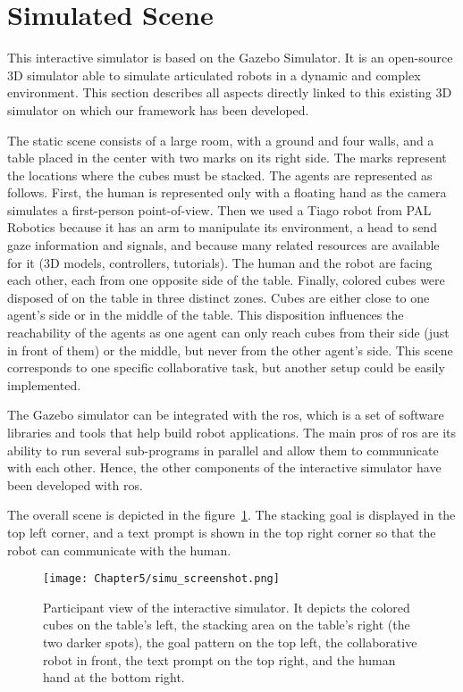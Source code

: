 \section{Simulated Scene}

This interactive simulator is based on the Gazebo Simulator. It is an open-source 3D simulator able to simulate articulated robots in a dynamic and complex environment.
This section describes all aspects directly linked to this existing 3D simulator on which our framework has been developed.

The static scene consists of a large room, with a ground and four walls, and a table placed in the center with two marks on its right side. The marks represent the locations where the cubes must be stacked. The agents are represented as follows. First, the human is represented only with a floating hand as the camera simulates a first-person point-of-view. Then we used a Tiago robot from PAL Robotics because it has an arm to manipulate its environment, a head to send gaze information and signals, and because many related resources are available for it (3D models, controllers, tutorials). The human and the robot are facing each other, each from one opposite side of the table. Finally, colored cubes were disposed of on the table in three distinct zones. Cubes are either close to one agent's side or in the middle of the table. This disposition influences the reachability of the agents as one agent can only reach cubes from their side (just in front of them) or the middle, but never from the other agent's side. This scene corresponds to one specific collaborative task, but another setup could be easily implemented. 

The Gazebo simulator can be integrated with the \acrfull{ros}, which is a set of software libraries and tools that help build robot applications. The main pros of \acrshort{ros} are its ability to run several sub-programs in parallel and allow them to communicate with each other. Hence, the other components of the interactive simulator have been developed with \acrshort{ros}.

The overall scene is depicted in the figure~\ref{fig:simu_view}. The stacking goal is displayed in the top left corner, and a text prompt is shown in the top right corner so that the robot can communicate with the human.

\begin{figure}[h]
    \centering
    \texttt{[image: Chapter5/simu\_screenshot.png]}
    \caption{Participant view of the interactive simulator. It depicts the colored cubes on the table's left, the stacking area on the table's right (the two darker spots), the goal pattern on the top left, the collaborative robot in front, the text prompt on the top right, and the human hand at the bottom right.}
    \label{fig:simu_view}
\end{figure}


